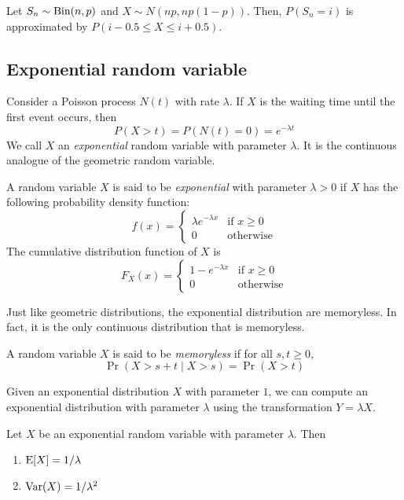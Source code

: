 \documentclass{article}
\begin{document}
\begin{remark}
  Let $S_n \sim \textnormal{Bin}(n, p)$ and $X \sim N(np, np(1 - p))$.
  Then, $P(S_n = i)$ is approximated by $P(i - 0.5 \leq X \leq i + 0.5)$.
\end{remark}

\subsection{Exponential random variable}

Consider a Poisson process $N(t)$ with rate $\lambda$.
If $X$ is the waiting time until the first event occurs, then
\[
  P(X > t) = P(N(t) = 0) = e^{-\lambda t}
\]
We call $X$ an \emph{exponential} random variable with parameter $\lambda$.
It is the continuous analogue of the geometric random variable.

\begin{definition}
  A random variable $X$ is said to be \emph{exponential} with parameter $\lambda > 0$ if $X$ has the following probability density function:
  \[
    f(x) = \begin{cases}
      \lambda e^{-\lambda x} & \text{if } x \geq 0 \\
      0                      & \text{otherwise}
    \end{cases}
  \]
  The cumulative distribution function of $X$ is
  \[
    F_X(x) = \begin{cases}
      1 - e^{-\lambda x} & \text{if } x \geq 0 \\
      0                  & \text{otherwise}
    \end{cases}
  \]
\end{definition}

Just like geometric distributions, the exponential distribution are memoryless.
In fact, it is the only continuous distribution that is memoryless.
\begin{definition}[Memorylessness]
  A random variable $X$ is said to be \emph{memoryless} if for all $s, t \geq 0$,
  \[
    \Pr(X > s + t \mid X > s) = \Pr(X > t)
  \]
\end{definition}

\begin{remark}
  Given an exponential distribution $X$ with parameter $1$, we can compute an exponential distribution with parameter $\lambda$ using the transformation $Y = \lambda X$.
\end{remark}

\begin{proposition}
  Let $X$ be an exponential random variable with parameter $\lambda$.
  Then
  \begin{enumerate}
    \item $\operatorname{E}[X] = 1/\lambda$
    \item $\operatorname{Var}(X) = 1/\lambda^2$
  \end{enumerate}
\end{proposition}
\end{document}
